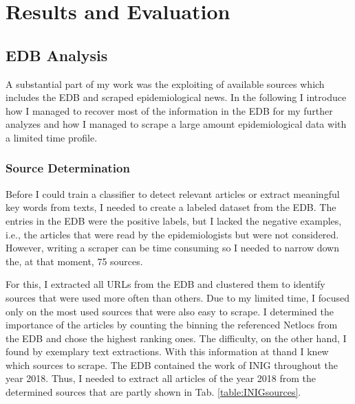 \chapter{Results and Evaluation}

\section{EDB Analysis}\label{edb analysis}
A substantial part of my work was the exploiting of available sources which includes the EDB and scraped epidemiological news. In the following I introduce how I managed to recover most of the information in the EDB for my further analyzes and how I managed to scrape a large amount epidemiological data with a limited time profile.

\subsection{Source Determination}
Before I could train a classifier to detect relevant articles or extract meaningful key words from texts, I needed to create a labeled dataset from the EDB. The entries in the EDB were the positive labels, but I lacked the negative examples, i.e., the articles that were read by the epidemiologists but were not considered. However, writing a scraper can be time consuming so I needed to narrow down the, at that moment, 75 sources.

For this, I extracted all URLs from the EDB and clustered them to identify sources that were used more often than others. Due to my limited time, I focused only on the most used sources that were also easy to scrape. I determined the importance of the articles by counting the binning the referenced Netlocs from the EDB and chose the highest ranking ones. The difficulty, on the other hand, I found by exemplary text extractions. With this information at thand I knew which sources to scrape. The EDB contained the work of INIG throughout the year 2018. Thus, I needed to extract all articles of the year 2018 from the determined sources that are partly shown in Tab. \ref{table:INIGsources}.

